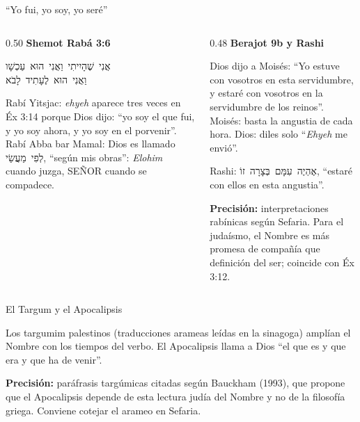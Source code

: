 \documentclass[hyperref={bookmarks=false},aspectratio=169]{beamer}
\newcommand{\heb}[1]{\mbox{\foreignlanguage{hebrew}{#1}}}
\newcommand{\grc}[1]{\foreignlanguage{ancientgreek}{#1}}
\newcommand{\SENOR}{S{\fontsize{0.78em}{1em}\selectfont EÑOR}}
\newcommand{\precision}[1]{{\footnotesize\color{gris}\textbf{Precisión:} #1}}
\begin{document}
\begin{frame}{``Yo fui, yo soy, yo seré''}
\begin{columns}[t,onlytextwidth]
\begin{column}{0.50\textwidth}
\textbf{\small Shemot Rabá 3:6}\par\smallskip
\begin{center}\heb{אֲנִי שֶׁהָיִיתִי וַאֲנִי הוּא עַכְשָׁו}\\ \heb{וַאֲנִי הוּא לֶעָתִיד לָבֹא}\end{center}
\scriptsize Rabí Yitsjac: \emph{ehyeh} aparece tres veces en Éx 3:14 porque Dios dijo: ``yo soy el que fui, y yo soy ahora, y yo soy en el porvenir''. Rabí Abba bar Mamal: Dios es llamado \heb{לְפִי מַעֲשַׂי}, ``según mis obras'': \emph{Elohim} cuando juzga, \SENOR{} cuando se compadece.
\end{column}
\begin{column}{0.48\textwidth}
\textbf{\small Berajot 9b y Rashi}\par\smallskip
\scriptsize Dios dijo a Moisés: ``Yo estuve con vosotros en esta servidumbre, y estaré con vosotros en la servidumbre de los reinos''. Moisés: basta la angustia de cada hora. Dios: diles solo ``\emph{Ehyeh} me envió''.\par\smallskip
Rashi: \heb{אֶהְיֶה עִמָּם בְּצָרָה זוֹ}, ``estaré con ellos en esta angustia''.\par\medskip
\precision{interpretaciones rabínicas según Sefaria. Para el judaísmo, el Nombre es más promesa de compañía que definición del ser; coincide con Éx 3:12.}
\end{column}
\end{columns}
\end{frame}

\begin{frame}{El Targum y el Apocalipsis}
\centering
{}\par\medskip
\small Los targumim palestinos (traducciones arameas leídas en la sinagoga) amplían el Nombre con los tiempos del verbo. El Apocalipsis llama a Dios ``el que es y que era y que ha de venir''.\par\medskip
\precision{paráfrasis targúmicas citadas según Bauckham (1993), que propone que el Apocalipsis depende de esta lectura judía del Nombre y no de la filosofía griega. Conviene cotejar el arameo en Sefaria.}
\end{frame}
\end{document}
